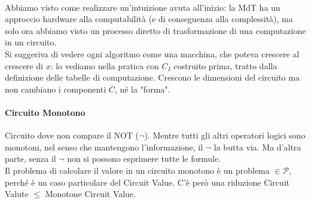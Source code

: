 \documentclass[10pt]{book}
\begin{document}
\paragraph{} Abbiamo visto come realizzare un'intuizione avuta all'inizio: la MdT ha un approccio hardware alla computabilità (e di conseguenza alla complessità), ma solo ora abbiamo visto un processo diretto di trasformazione di una computazione in un circuito.\\
Si suggeriva di vedere ogni algoritmo come una macchina, che poteva crescere al crescere di $x$: lo vediamo nella pratica con $C_I$ costruito prima, tratto dalla definizione delle tabelle di computazione. Crescono le dimensioni del circuito ma non cambiano i componenti $\overline{C}$, né la "forma".
\paragraph{Circuito Monotono} Circuito dove non compare il NOT ($\neg$). Mentre tutti gli altri operatori logici sono monotoni, nel senso che mantengono l'informazione, il $\neg$ la butta via. Ma d'altra parte, senza il $\neg$ non si possono esprimere tutte le formule.\\
Il problema di calcolare il valore in un circuito monotono è un problema $\in \mathscr{P}$, perché è un caso particolare del Circuit Value. C'è però una riduzione Circuit Valute $\leq$ Monotone Circuit Value.
\end{document}
